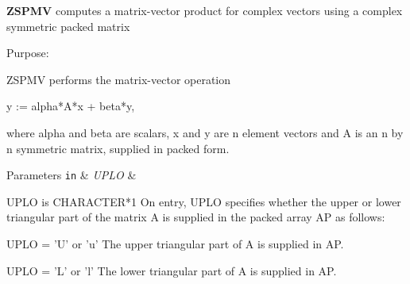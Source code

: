 {\bfseries Z\+S\+P\+M\+V} computes a matrix-\/vector product for complex vectors using a complex symmetric packed matrix 

 \begin{DoxyParagraph}{Purpose\+: }
\begin{DoxyVerb} ZSPMV  performs the matrix-vector operation

    y := alpha*A*x + beta*y,

 where alpha and beta are scalars, x and y are n element vectors and
 A is an n by n symmetric matrix, supplied in packed form.\end{DoxyVerb}
 
\end{DoxyParagraph}

\begin{DoxyParams}[1]{Parameters}
\mbox{\tt in}  & {\em U\+P\+L\+O} & \begin{DoxyVerb}          UPLO is CHARACTER*1
           On entry, UPLO specifies whether the upper or lower
           triangular part of the matrix A is supplied in the packed
           array AP as follows:

              UPLO = 'U' or 'u'   The upper triangular part of A is
                                  supplied in AP.

              UPLO = 'L' or 'l'   The lower triangular part of A is
                                  supplied in AP.


\end{DoxyVerb}
\end{DoxyParams}
